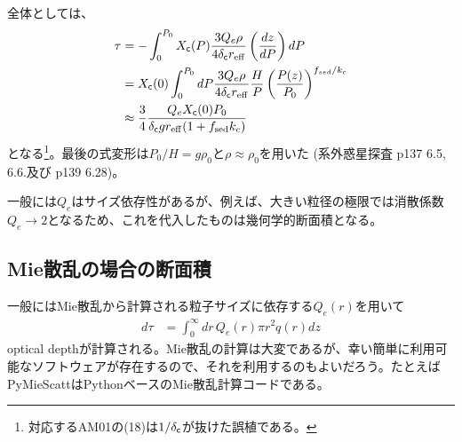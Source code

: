 全体としては、
\begin{align}
\tau &= - \int_0^{P_0} X_{\mathsf{c}} (P) \frac{3  Q_e \rho}{4 \delta_{\mathsf{c}} r_\mathrm{eff}} \left( \frac{dz}{dP} \right) dP \\
&=  X_{\mathsf{c}} (0) \int_0^{P_0}  dP \frac{3 Q_e \rho}{4 \delta_{\mathsf{c}} r_\mathrm{eff}}  \frac{H}{P} \left( \frac{P(z)}{P_0} \right)^{f_{sed}/k_c}\\
&\approx   \frac{3}{4} \frac{ Q_e X_{\mathsf{c}}(0) P_0}{ \delta_{\mathsf{c}} g  r_\mathrm{eff} (1 + f_\mathrm{sed} k_c) }
\end{align} 
となる\footnote{対応するAM01の(18)は$1/\delta_{\mathsf{c}}$が抜けた誤植である。}。最後の式変形は$P_0/H = g \rho_0$と$\rho \approx \rho_0$を用いた (系外惑星探査 p137 6.5, 6.6.及び p139 6.28)。

一般には$Q_e$はサイズ依存性があるが、例えば、大きい粒径の極限では消散係数$Q_e \to 2$となるため、これを代入したものは幾何学的断面積となる。

\subsection*{Mie散乱の場合の断面積}

一般にはMie散乱から計算される粒子サイズに依存する$Q_e(r)$を用いて
\begin{align}
d \tau &= \int_0^\infty dr \, Q_e (r) \pi r^2 q(r) d z 
\end{align}
optical depthが計算される。Mie散乱の計算は大変であるが、幸い簡単に利用可能なソフトウェアが存在するので、それを利用するのもよいだろう。たとえば{\sf PyMieScatt}はPythonベースのMie散乱計算コードである。


